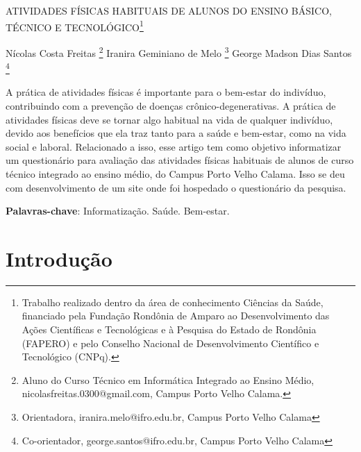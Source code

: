 \documentclass[article,12pt,onesidea,4paper,english,brazil,]{abntex2}
\begin{document}
	
	
	\frenchspacing 
	
	\begin{center}
		\LARGE ATIVIDADES FÍSICAS HABITUAIS DE ALUNOS DO ENSINO BÁSICO, TÉCNICO E TECNOLÓGICO\footnote{Trabalho realizado dentro da área de conhecimento Ciências da Saúde, financiado pela Fundação Rondônia de Amparo ao Desenvolvimento das Ações Científicas e Tecnológicas e à Pesquisa do Estado de Rondônia (FAPERO) e pelo Conselho Nacional de Desenvolvimento Científico e Tecnológico (CNPq).}
		
		\normalsize
	Nícolas Costa Freitas \footnote{Aluno do Curso Técnico em Informática Integrado ao Ensino Médio, nicolasfreitas.0300@gmail.com, Campus Porto Velho Calama.} 
		Iranira Geminiano de Melo \footnote{Orientadora, iranira.melo@ifro.edu.br, Campus Porto Velho Calama} 
	George Madson Dias Santos \footnote{Co-orientador, george.santos@ifro.edu.br, Campus Porto Velho Calama} 
		 
	\end{center}
	
	\begin{resumoumacoluna}
		A prática de atividades físicas é importante para o bem-estar do indivíduo, contribuindo com a prevenção de doenças crônico-degenerativas. A prática de atividades físicas deve se tornar algo habitual na vida de qualquer indivíduo, devido aos benefícios que ela traz tanto para a saúde e bem-estar, como na vida social e laboral. Relacionado a isso, esse artigo tem como objetivo informatizar um questionário para avaliação das atividades físicas habituais de alunos de curso técnico integrado ao ensino médio, do Campus Porto Velho Calama. Isso se deu com desenvolvimento de um site onde foi hospedado o questionário da pesquisa.
		
		\vspace{\onelineskip}
		
		\noindent
		\textbf{Palavras-chave}: Informatização. Saúde. Bem-estar.
	\end{resumoumacoluna}
	
	\textual
	
	\section*{Introdução}
	
\end{document}
